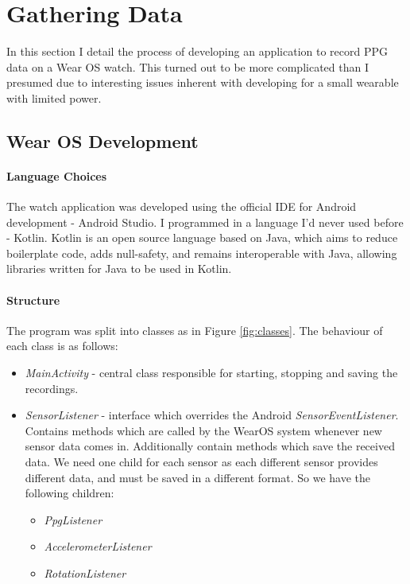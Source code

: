 \documentclass[12pt,a4paper,twoside,openright]{report}
\begin{document}
\section{Gathering Data}

In this section I detail the process of developing an
application to record PPG data on a Wear OS watch. This turned out to be more
complicated than I presumed due to interesting issues inherent with developing for a small
wearable with limited power.

\subsection{Wear OS Development}

\paragraph{Language Choices}

The watch application was developed using the official IDE for Android
development - Android Studio. I programmed in a language I'd never used before
- Kotlin. Kotlin is an open source language based on Java, which aims to
reduce boilerplate code, adds null-safety, and remains interoperable with
Java, allowing libraries written for Java to be used in Kotlin.

\paragraph{Structure}

The program was split into classes as in Figure \ref{fig:classes}. The
behaviour of each class is as follows:

\begin{itemize}
	\item \emph{MainActivity} - central class responsible for starting,
		stopping and saving the recordings.

	\item \emph{SensorListener} - interface which overrides the Android
		\emph{SensorEventListener}. Contains methods which
		are called by the WearOS system whenever new sensor data comes
		in. Additionally contain methods which save the received data.
		We need one child for each sensor as each different sensor
		provides different data, and must be saved in a different
		format. So we have the following children:

	\begin{itemize}
		\item \emph{PpgListener}
		\item \emph{AccelerometerListener}
		\item \emph{RotationListener}
	\end{itemize}

\end{itemize}
\end{document}
